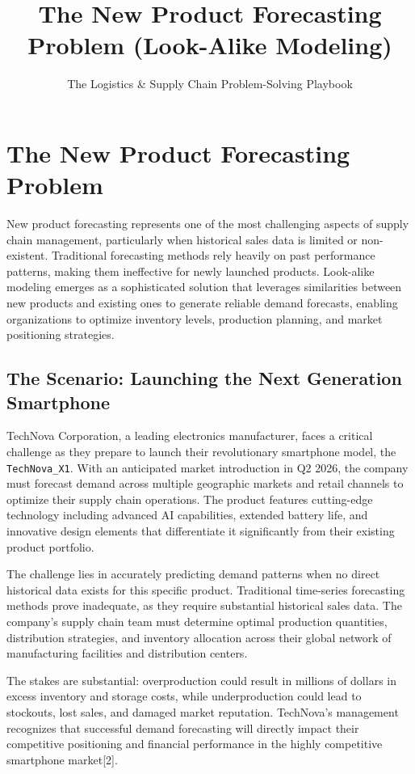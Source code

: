 \documentclass{article}
\title{The New Product Forecasting Problem (Look-Alike Modeling)}
\author{The Logistics \& Supply Chain Problem-Solving Playbook}
\date{}
\begin{document}
\maketitle

\section{The New Product Forecasting Problem}

New product forecasting represents one of the most challenging aspects of supply chain management, particularly when historical sales data is limited or non-existent. Traditional forecasting methods rely heavily on past performance patterns, making them ineffective for newly launched products. Look-alike modeling emerges as a sophisticated solution that leverages similarities between new products and existing ones to generate reliable demand forecasts, enabling organizations to optimize inventory levels, production planning, and market positioning strategies.

\subsection{The Scenario: Launching the Next Generation Smartphone}

TechNova Corporation, a leading electronics manufacturer, faces a critical challenge as they prepare to launch their revolutionary smartphone model, the \texttt{TechNova\_X1}. With an anticipated market introduction in Q2 2026, the company must forecast demand across multiple geographic markets and retail channels to optimize their supply chain operations. The product features cutting-edge technology including advanced AI capabilities, extended battery life, and innovative design elements that differentiate it significantly from their existing product portfolio.

The challenge lies in accurately predicting demand patterns when no direct historical data exists for this specific product. Traditional time-series forecasting methods prove inadequate, as they require substantial historical sales data. The company's supply chain team must determine optimal production quantities, distribution strategies, and inventory allocation across their global network of manufacturing facilities and distribution centers.

The stakes are substantial: overproduction could result in millions of dollars in excess inventory and storage costs, while underproduction could lead to stockouts, lost sales, and damaged market reputation. TechNova's management recognizes that successful demand forecasting will directly impact their competitive positioning and financial performance in the highly competitive smartphone market[2].
\end{document}
